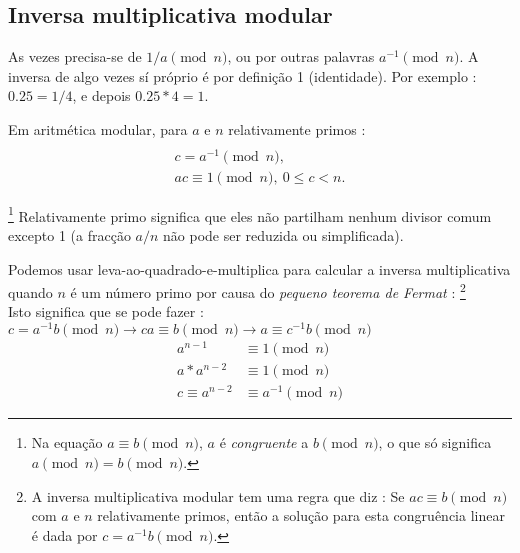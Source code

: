 \subsection{Inversa multiplicativa modular}

As vezes precisa-se de $1/a \pmod n$, ou por outras palavras $a^{-1} \pmod n$. A inversa de algo vezes sí próprio é por definição 1 (identidade). Por exemplo : $0.25 = 1/4$, e depois $0.25*4 = 1$.  


Em aritmética modular, para $a$ e $n$ relativamente primos : 
\begin{align*} 
\\c = a^{-1} \pmod{n},
\\a c \equiv 1 \pmod{n},\ 0 \leq c < n. 
\end{align*}


\footnote{Na equação $a \equiv b \pmod{n}$, $a$ é {\em congruente} a $b \pmod{n}$, o que só significa \(a \pmod{n} = b \pmod{n}\).}
Relativamente primo significa que eles não partilham nenhum divisor comum excepto 1 (a fracção $a/n$ não pode ser reduzida ou simplificada).

Podemos usar leva-ao-quadrado-e-multiplica para calcular a inversa multiplicativa quando $n$ é um número primo por causa do {\em pequeno teorema de Fermat} :
\footnote{\label{inverse_rule_note}A inversa multiplicativa modular tem uma regra que diz :
Se $a c \equiv b \pmod{n}$ com $a$ e $n$ relativamente primos, então a solução para esta congruência linear é dada por \(c = a^{-1} b \pmod{n}\).}\cite{wiki-modular-arithmetic}\\
Isto significa que se pode fazer :
$c = a^{-1} b \pmod n \rightarrow ca \equiv b \pmod n \rightarrow a \equiv c^{-1} b \pmod n$
\begin{align*} 
    a^{n-1} &\equiv 1 \pmod{n} \\
    a*a^{n-2} &\equiv 1 \pmod{n} \\
    c \equiv a^{n-2} &\equiv a^{-1} \pmod{n}
\end{align*}


